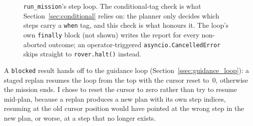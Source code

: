 \begin{figure}[htbp]
  \centering
  \caption{\texttt{run\_mission}'s step loop. The conditional-tag check is what Section~\ref{sec:conditional} relies on: the planner only decides which steps carry a \texttt{when} tag, and this check is what honours it. The loop's own \texttt{finally} block (not shown) writes the report for every non-aborted outcome; an operator-triggered \texttt{asyncio.CancelledError} skips straight to \texttt{rover.halt()} instead.}
  \label{fig:flow-mission}
\end{figure}

A \texttt{blocked} result hands off to the guidance loop
(Section~\ref{ssec:guidance_loop}): a staged replan resumes the loop from
the top with the cursor reset to~0, otherwise the mission ends. I chose to
reset the cursor to zero rather than try to resume mid-plan, because a
replan produces a new plan with its own step indices, resuming at the old
cursor position would have pointed at the wrong step in the new plan, or
worse, at a step that no longer exists.

